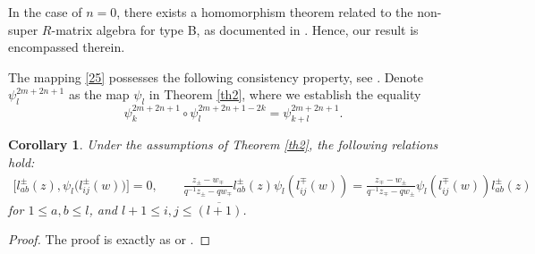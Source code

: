 \documentclass[pdftex]{sigma}
\numberwithin{equation}{section}
\newtheorem{Corollary}[Theorem]{Corollary}
\begin{document}
\begin{Remark}\label{RM3}
In the case of $n=0$, there exists a homomorphism theorem related to the non-super $R$-matrix algebra for type B, as documented in \cite[Theorem 3.7]{JMAB}. Hence, our result is encompassed therein.
\end{Remark}

The mapping \eqref{25} possesses the following consistency property, see \cite{IGA}. Denote $\psi^{2m+2n+1}_l$ as the map $\psi_l$ in Theorem \ref{th2}, where we establish the equality
\begin{equation*}%
 \psi^{2m+2n+1}_k\circ\psi^{2m+2n+1-2k}_l=\psi^{2m+2n+1}_{k+l}.
\end{equation*}

\begin{Corollary}\label{co1}
Under the assumptions of Theorem {\rm\ref{th2}}, the following relations hold:
\begin{gather*}
 \bigl[l_{ab}^{\pm}(z), \psi_l\bigl( l_{ij}^{\pm}(w)\bigr)\bigr] = 0, \qquad
 \frac{z_{\pm}-w_{\mp}}{q^{-1}z_{\pm}-qw_{\mp}}l_{ab}^{\pm}(z)\psi_l( l_{ij}^{\mp}(w))=\frac{z_{\mp}-w_{\pm}}{q^{-1}z_{\mp}-qw_{\pm}}\psi_l( l_{ij}^{\mp}(w))l_{ab}^{\pm}(z)
\end{gather*}
for $1\leq a,b\leq l$, and $l+1\leq i,j\leq \overline{(l+1)}$.
\end{Corollary}

\begin{proof}
The proof is exactly as \cite[Corollary 3.10]{JMA} or \cite[Corollary 3.8]{JMAB}.
\end{proof}
\end{document}
